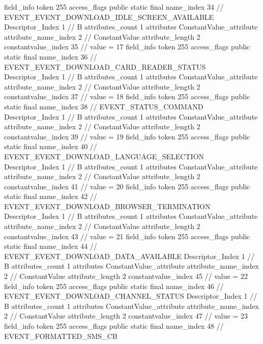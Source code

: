 {{{{{{{				}
				}
			}
			field_info {
				token	255
				access_flags	public static final
				name_index	34		// EVENT_EVENT_DOWNLOAD_IDLE_SCREEN_AVAILABLE
				Descriptor_Index	1		// B
				attributes_count	1
				attributes {
				ConstantValue_attribute {
					attribute_name_index	2		// ConstantValue
					attribute_length	2
					constantvalue_index	35		// value = 17
				}
				}
			}
			field_info {
				token	255
				access_flags	public static final
				name_index	36		// EVENT_EVENT_DOWNLOAD_CARD_READER_STATUS
				Descriptor_Index	1		// B
				attributes_count	1
				attributes {
				ConstantValue_attribute {
					attribute_name_index	2		// ConstantValue
					attribute_length	2
					constantvalue_index	37		// value = 18
				}
				}
			}
			field_info {
				token	255
				access_flags	public static final
				name_index	38		// EVENT_STATUS_COMMAND
				Descriptor_Index	1		// B
				attributes_count	1
				attributes {
				ConstantValue_attribute {
					attribute_name_index	2		// ConstantValue
					attribute_length	2
					constantvalue_index	39		// value = 19
				}
				}
			}
			field_info {
				token	255
				access_flags	public static final
				name_index	40		// EVENT_EVENT_DOWNLOAD_LANGUAGE_SELECTION
				Descriptor_Index	1		// B
				attributes_count	1
				attributes {
				ConstantValue_attribute {
					attribute_name_index	2		// ConstantValue
					attribute_length	2
					constantvalue_index	41		// value = 20
				}
				}
			}
			field_info {
				token	255
				access_flags	public static final
				name_index	42		// EVENT_EVENT_DOWNLOAD_BROWSER_TERMINATION
				Descriptor_Index	1		// B
				attributes_count	1
				attributes {
				ConstantValue_attribute {
					attribute_name_index	2		// ConstantValue
					attribute_length	2
					constantvalue_index	43		// value = 21
				}
				}
			}
			field_info {
				token	255
				access_flags	public static final
				name_index	44		// EVENT_EVENT_DOWNLOAD_DATA_AVAILABLE
				Descriptor_Index	1		// B
				attributes_count	1
				attributes {
				ConstantValue_attribute {
					attribute_name_index	2		// ConstantValue
					attribute_length	2
					constantvalue_index	45		// value = 22
				}
				}
			}
			field_info {
				token	255
				access_flags	public static final
				name_index	46		// EVENT_EVENT_DOWNLOAD_CHANNEL_STATUS
				Descriptor_Index	1		// B
				attributes_count	1
				attributes {
				ConstantValue_attribute {
					attribute_name_index	2		// ConstantValue
					attribute_length	2
					constantvalue_index	47		// value = 23
				}
				}
			}
			field_info {
				token	255
				access_flags	public static final
				name_index	48		// EVENT_FORMATTED_SMS_CB
}}}}}

